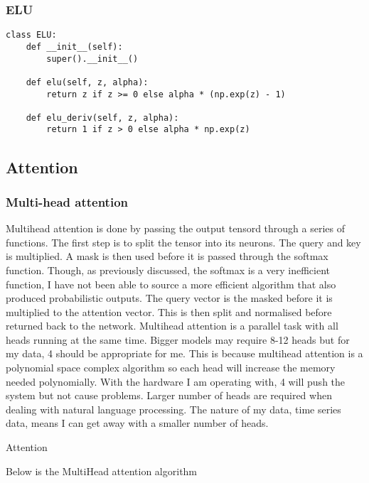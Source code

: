 \documentclass{article}
\begin{document}
\subsubsection{ELU}
\begin{lstlisting}
class ELU:
    def __init__(self):
        super().__init__()

    def elu(self, z, alpha):
        return z if z >= 0 else alpha * (np.exp(z) - 1)

    def elu_deriv(self, z, alpha):
        return 1 if z > 0 else alpha * np.exp(z)
\end{lstlisting}


\subsection{Attention}
\subsubsection{Multi-head attention}
Multihead attention is done by passing the output tensord through a series of functions.
The first step is to split the tensor into its neurons. The query and key is multiplied.
A mask is then used before it is passed through the softmax function. Though, as
previously discussed, the softmax is a very inefficient function, I have not been
able to source a more efficient algorithm that also produced probabilistic outputs.
The query vector is the masked before it is multiplied to the attention vector.
This is then split and normalised before returned back to the network.
Multihead attention is a parallel task with all heads running at the same time. Bigger
models may require 8-12 heads but for my data, 4 should be appropriate for me. This
is because multihead attention is a polynomial space complex algorithm so each head
will increase the memory needed polynomially. With the hardware I am operating with,
4 will push the system but not cause problems. Larger number of heads are required when
dealing with natural language processing. The nature of my data, time series data, means I can get away with a smaller number of heads.


\begin{algorithm}
    \caption{Attention}
    \begin{algorithmic}[1]
    \State  {}
    \EndFor{}
    \end{algorithmic}
\end{algorithm}
\clearpage
Below is the MultiHead attention algorithm
\end{document}
